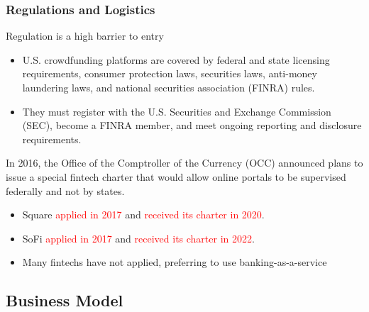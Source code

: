 \documentclass[aspectratio=169,xcolor=dvipsnames]{beamer}
\begin{document}
\begin{frame}
\frametitle{Regulations and Logistics}

Regulation is a high barrier to entry
\begin{itemize}
        \item U.S. crowdfunding platforms are covered by federal and state licensing requirements, consumer protection laws, securities laws, anti-money laundering laws, and national securities association (FINRA) rules.
        \item They must register with the U.S. Securities and Exchange Commission (SEC), become a FINRA member, and meet ongoing reporting and disclosure requirements.
    \end{itemize}

\medskip 

In 2016, the Office of the Comptroller of the Currency (OCC) announced plans to issue a special fintech charter that would allow online portals to be supervised federally and not by states.
\begin{itemize}
    \item Square \textcolor{red}{applied in 2017} and \textcolor{red}{received its charter in 2020}.
    \item SoFi \textcolor{red}{applied in 2017} and \textcolor{red}{received its charter in 2022}.
    \item Many fintechs have not applied, preferring to use banking-as-a-service 
\end{itemize}



\end{frame} 

\subsection{Business Model}
\end{document}
